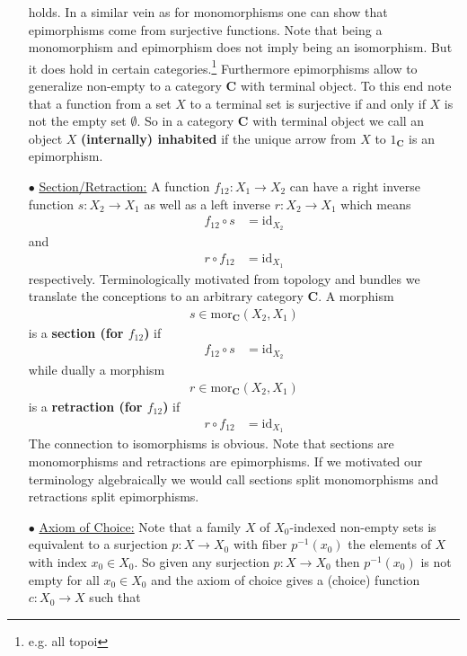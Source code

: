 \begin{exa}
\begin{enumerate}
holds. In a similar vein as for monomorphisms one can show that epimorphisms come from surjective functions. Note that being a monomorphism and epimorphism does not imply being an isomorphism. But it does hold in certain categories.\footnote{e.g. all topoi} Furthermore epimorphisms allow to generalize {\glqq}non-empty{\grqq} to a category $\mathbf{C}$ with terminal object. To this end note that a function from a set $X$ to a terminal set is surjective if and only if $X$ is not the empty set $\emptyset$. So in a category $\mathbf{C}$ with terminal object we call an object $X$ \textbf{(internally) inhabited} if the unique arrow from $X$ to $1_{\mathbf{C}}$ is an epimorphism.
\item[$\bullet$]
\underline{Section/Retraction:}
A function $f_{12} \colon X_{1} \rightarrow X_{2}$ can have a right inverse function $s \colon X_{2} \rightarrow X_{1}$ as well as a left inverse $r \colon X_{2} \rightarrow X_{1}$ which means
\begin{align*}
  f_{12}
  \circ
  s
  &=
  \mathrm{id}_{X_{2}}
\end{align*}
and
\begin{align*}
  r
  \circ
  f_{12}
  &=
  \mathrm{id}_{X_{1}}
\end{align*}
respectively. Terminologically motivated from topology and bundles we translate the conceptions to an arbitrary category $\mathbf{C}$. A morphism
\begin{align*}
  s
  \in
  \mathrm{mor}_{\mathbf{C}}(X_{2},X_{1})
\end{align*}
is a \textbf{section (for $f_{12}$)} if
\begin{align*}
  f_{12}
  \circ
  s
  &=
  \mathrm{id}_{X_{2}}
\end{align*}
while dually a morphism
\begin{align*}
  r
  \in
  \mathrm{mor}_{\mathbf{C}}(X_{2},X_{1})
\end{align*}
is a \textbf{retraction (for $f_{12}$)} if
\begin{align*}
  r
  \circ
  f_{12}
  &=
  \mathrm{id}_{X_{1}}
\end{align*}
The connection to isomorphisms is obvious. Note that sections are monomorphisms and retractions are epimorphisms. If we motivated our terminology algebraically we would call sections split monomorphisms and retractions split epimorphisms.
\item[$\bullet$]
\underline{Axiom of Choice:}
Note that a family $X$ of $X_{0}$-indexed non-empty sets is equivalent to a surjection $p \colon X \rightarrow X_{0}$ with fiber $p^{-1}(x_{0})$ the elements of $X$ with index $x_{0} \in X_{0}$. So given any surjection $p \colon X \rightarrow X_{0}$ then $p^{-1}(x_{0})$ is not empty for all $x_{0} \in X_{0}$ and the axiom of choice gives a (choice) function $c \colon X_{0} \rightarrow X$ such that

\end{enumerate}
\end{exa}
